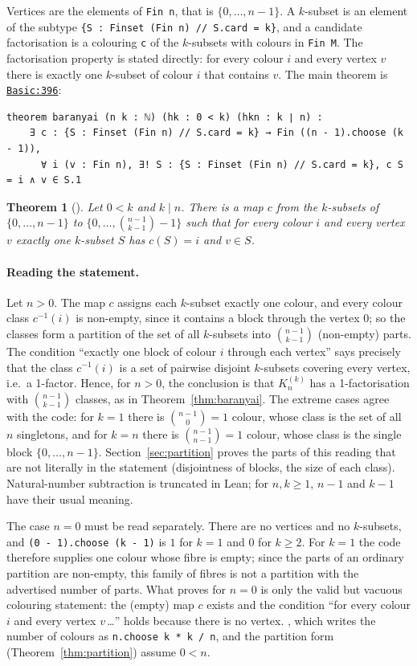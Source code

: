 \documentclass[11pt]{article}
\newtheorem{theorem}{Theorem}
\theoremstyle{definition}
\theoremstyle{remark}
\newcommand{\lean}[1]{\texttt{#1}}
\newcommand{\repo}{https://github.com/jpbald93/baranyai}
\newcommand{\commit}{051ae8c4063be0bb70f1726e9f60d0319dd37d91}
\newcommand{\src}[2]{\href{\repo/blob/\commit/Baranyai/#1.lean\#L#2}{\texttt{#1:#2}}}
\begin{document}
Vertices are the elements of \lean{Fin n}, that is $\{0,\dots,n-1\}$. A $k$-subset is an element of
the subtype \lean{\{S : Finset (Fin n) // S.card = k\}}, and a candidate factorisation is a
colouring \lean{c} of the $k$-subsets with colours in \lean{Fin M}. The factorisation property is
stated directly: for every colour $i$ and every vertex $v$ there is exactly one $k$-subset of colour
$i$ that contains $v$. The main theorem is
\src{Basic}{396}:
\begin{lstlisting}
theorem baranyai (n k : ℕ) (hk : 0 < k) (hkn : k ∣ n) :
    ∃ c : {S : Finset (Fin n) // S.card = k} → Fin ((n - 1).choose (k - 1)),
      ∀ i (v : Fin n), ∃! S : {S : Finset (Fin n) // S.card = k}, c S = i ∧ v ∈ S.1
\end{lstlisting}

\begin{theorem}[]\label{thm:formal}
Let $0<k$ and $k\mid n$. There is a map $c$ from the $k$-subsets of $\{0,\dots,n-1\}$ to
$\{0,\dots,\binom{n-1}{k-1}-1\}$ such that for every colour $i$ and every vertex $v$ exactly one
$k$-subset $S$ has $c(S)=i$ and $v\in S$.
\end{theorem}

\paragraph{Reading the statement.} Let $n>0$. The map $c$ assigns each $k$-subset exactly one
colour, and every colour class $c^{-1}(i)$ is non-empty, since it contains a block through the
vertex $0$; so the classes form a partition of the set of all $k$-subsets into
$\binom{n-1}{k-1}$ (non-empty) parts. The condition ``exactly one block of colour $i$ through each
vertex'' says precisely that the class $c^{-1}(i)$ is a set of pairwise disjoint $k$-subsets
covering every vertex, i.e.\ a 1-factor. Hence, for $n>0$, the conclusion is that $K_n^{(k)}$ has a
1-factorisation with $\binom{n-1}{k-1}$ classes, as in Theorem~\ref{thm:baranyai}. The extreme
cases agree with the code: for $k=1$ there is $\binom{n-1}0=1$ colour, whose class is the set of
all $n$ singletons, and for $k=n$ there is $\binom{n-1}{n-1}=1$ colour, whose class is the single
block $\{0,\dots,n-1\}$. Section~\ref{sec:partition} proves the parts of this reading that are not
literally in the statement (disjointness of blocks, the size of each class). Natural-number
subtraction is truncated in Lean; for $n,k\ge1$, $n-1$ and $k-1$ have their usual meaning.

The case $n=0$ must be read separately. There are no vertices and no $k$-subsets, and
\lean{(0 - 1).choose (k - 1)} is $1$ for $k=1$ and $0$ for $k\ge2$. For $k=1$ the code therefore
supplies one colour whose fibre is empty; since the parts of an ordinary partition are non-empty,
this family of fibres is not a partition with the advertised number of parts. What
 proves for $n=0$ is only the valid but vacuous colouring statement: the (empty)
map $c$ exists and the condition ``for every colour $i$ and every vertex $v$\,\dots'' holds because
there is no vertex. , which writes the number of colours as
\lean{n.choose k * k / n}, and the partition form (Theorem~\ref{thm:partition}) assume $0<n$.
\end{document}
